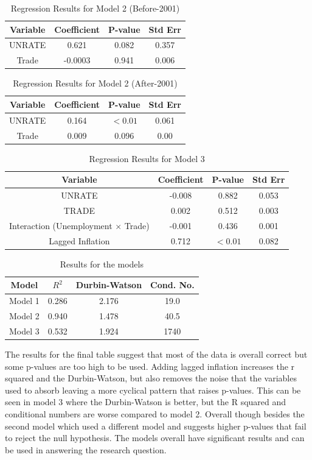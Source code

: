 \documentclass{article}
\begin{document}
\begin{table}[H]
\centering
\begin{tabular}{|c|c|c|c|}
\hline
Variable & Coefficient & P-value & Std Err \\
\hline
UNRATE & 0.621 & 0.082 & 0.357\\
Trade & -0.0003 & 0.941 & 0.006\\
\hline
\end{tabular}
\caption{Regression Results for Model 2 (Before-2001)}
\end{table}

\begin{table}[H]
\centering
\begin{tabular}{|c|c|c|c|}
\hline
Variable & Coefficient & P-value & Std Err \\
\hline
UNRATE & 0.164 & $<0.01$ & 0.061\\
Trade & 0.009 & 0.096 & 0.00\\
\hline
\end{tabular}
\caption{Regression Results for Model 2 (After-2001)}
\end{table}

\begin{table}[H]
\centering
\begin{tabular}{|c|c|c|c|}
\hline
Variable & Coefficient & P-value & Std Err \\
\hline
UNRATE & -0.008 & 0.882 & 0.053\\
TRADE & 0.002 & 0.512 & 0.003\\
Interaction (Unemployment $\times$ Trade) & -0.001 & 0.436 & 0.001\\
Lagged Inflation & 0.712 & $<0.01$ & 0.082\\
\hline
\end{tabular}
\caption{Regression Results for Model 3}
\end{table}

\begin{table}[H]
\centering
\begin{tabular}{|c|c|c|c|}
\hline
Model & $R^2$ & Durbin-Watson & Cond. No. \\
\hline
Model 1 & 0.286 & 2.176 & 19.0\\
Model 2 & 0.940 & 1.478 & 40.5\\
Model 3 & 0.532 & 1.924 & 1740\\
\hline
\end{tabular}
\caption{Results for the models}
\end{table}

The results for the final table suggest that most of the data is overall correct but some p-values are too high to be used. Adding lagged inflation increases the r squared and the Durbin-Watson, but also removes the noise that the variables used to absorb leaving a more cyclical pattern that raises p-values. This can be seen in model 3 where the Durbin-Watson is better, but the R squared and conditional numbers are worse compared to model 2. Overall though besides the second model which used a different model and suggests higher p-values that fail to reject the null hypothesis. The models overall have significant results and can be used in answering the research question.
\end{document}
